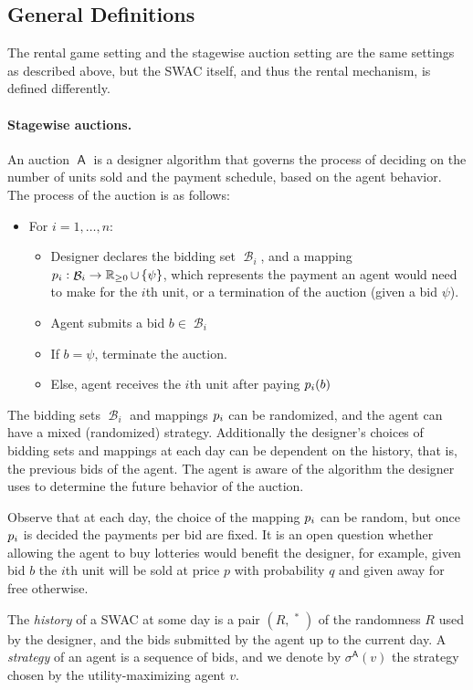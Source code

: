 \documentclass[11pt,letterpaper]{article}
\newcommand{\set}[1]{\left\{#1\right\}}
\newcommand{\swac}{SWAC\xspace}
\newcommand{\reals}{\mathbb{R}}
\DeclareMathOperator{\preals}{\reals_{\geq0}}
\DeclareMathOperator{\A}{\auc{A}}
\DeclareMathOperator{\B}{\mathcal{B}}
\theoremstyle{plain}
\newcommand{\auc}[1]{\mathsf{#1}}
\begin{document}
\subsection{General Definitions}\label{sec:general}
The rental game setting and the stagewise auction setting are the same settings as described above, but the \swac itself, and thus the rental mechanism, is defined differently.

\paragraph{Stagewise auctions.} An auction $\A$ is a designer algorithm that governs the process of deciding on the number of units sold and the payment schedule, based on the agent behavior. The process of the auction is as follows:
\begin{itemize}
    \item For $i=1,\dots,n$:
    \begin{itemize}
        \item Designer declares the bidding set $\B_i$, and a mapping $\spay_i:\B_i\rightarrow\preals\cup\set{\psi}$, which represents the payment an agent would need to make for the $i$th unit, or a termination of the auction (given a bid $\psi$).
        \item Agent submits a bid $b\in\B_i$
        \item If $b=\psi$, terminate the auction.
        \item Else, agent receives the $i$th unit after paying $\spay_i(b)$
    \end{itemize}
\end{itemize}
The bidding sets $\B_i$ and mappings $\spay_i$ can be randomized, and the agent can have a mixed (randomized) strategy. Additionally the designer's choices of bidding sets and mappings at each day can be dependent on the history, that is, the previous bids of the agent. The agent is aware of the algorithm the designer uses to determine the future behavior of the auction.

Observe that at each day, the choice of the mapping $\spay_i$ can be random, but once $\spay_i$ is decided the payments per bid are fixed. It is an open question whether allowing the agent to buy lotteries would benefit the designer, for example, given bid $b$ the $i$th unit will be sold at price $p$ with probability $q$ and given away for free otherwise.

The \emph{history} of a \swac at some day is a pair $(R,\preals^\ast)$ of the randomness $R$ used by the designer, and the bids submitted by the agent up to the current day. A \emph{strategy} of an agent is a sequence of bids, and we denote by $\sigma^{\A}(v)$ the strategy chosen by the utility-maximizing agent $v$.
\end{document}
